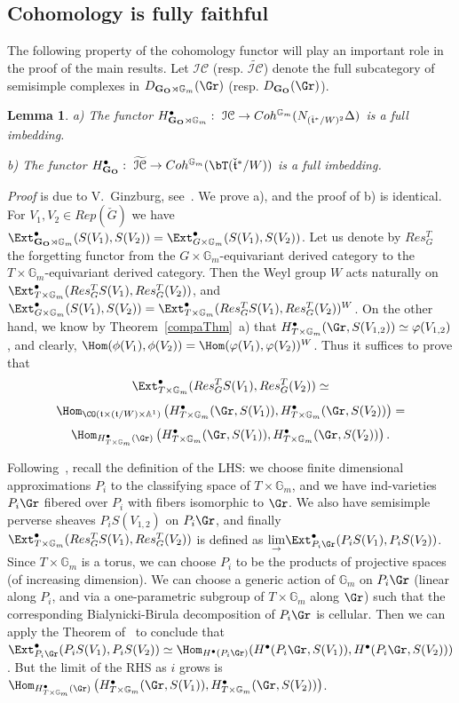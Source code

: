 \documentclass[11pt]{amsart}
\newtheorem{lem}{Lemma}
\theoremstyle{definition}
\theoremstyle{remark}
\theoremstyle{remark}
\newcommand{\<}{\langle}
\renewcommand{\>}{\rangle}
\renewcommand{\t}{{\frak t}}
\newcommand{\Lt}{\check{\mathfrak t}{}}
\newcommand{\LG}{{\check{G}}}
\newcommand{\GO}{{\bf G_O}}
\newcommand{\Aone}{{\mathbb A}^1}
\newcommand{\Gm}{{{\mathbb G}_m}}
\renewcommand{\proof}{{\it Proof }}
\newcommand{\CatTopss}{{\mathcal{IC}}}
\begin{document}
\subsection{Cohomology is fully faithful}
The following property of the cohomology functor will play an
important role in the proof of the main results.
Let $\CatTopss$ (resp. $\widetilde{\mathcal{IC}}$) 
denote the full subcategory of 
semisimple complexes in $D_{\GO\rtimes \Gm}(\Gr)$
(resp. $D_\GO(\Gr)$).


\begin{lem}
\label{fullyTop}
a) The functor $H_{\GO\rtimes\Gm}^\bullet:\
\CatTopss\to Coh^\Gm(N_{(\Lt^*/W)^2}\Delta)$ is a full
imbedding.

b) The functor $H_\GO^\bullet:\ 
\widetilde{\mathcal{IC}}\to Coh^\Gm(\bT(\Lt^*/W))$
is a full imbedding.
\end{lem}

\proof is due to V.~Ginzburg, see~\cite{G0}.
We prove a), and the proof of b) is identical.
For $V_1,V_2\in Rep(\LG)$ we have
$\Ext_{\GO\rtimes\Gm}^\bullet(S(V_1),S(V_2))=
\Ext_{G\times\Gm}^\bullet(S(V_1),S(V_2))$. Let us denote by $Res_G^T$
the forgetting functor from the $G\times\Gm$-equivariant derived
category to the $T\times\Gm$-equivariant derived category. Then the
Weyl group $W$ acts naturally on 
$\Ext_{T\times\Gm}^\bullet(Res_G^TS(V_1),Res_G^T(V_2))$, and 
$\Ext_{G\times\Gm}^\bullet(S(V_1),S(V_2))=
\Ext_{T\times\Gm}^\bullet(Res_G^TS(V_1),Res_G^T(V_2))^W$.
On the other hand, we know by Theorem~\ref{compaThm}~a) that
$H^\bullet_{T\times\Gm}(\Gr,S(V_{1,2}))\simeq\varphi(V_{1,2})$, and
clearly, $\Hom(\phi(V_1),\phi(V_2))=\Hom(\varphi(V_1),\varphi(V_2))^W$.
Thus it suffices to prove that
$$\Ext_{T\times\Gm}^\bullet(Res_G^TS(V_1),Res_G^T(V_2))\simeq$$
$$\Hom_{\CO(\t\times(\t/W)\times\Aone)}
\left(H^\bullet_{T\times\Gm}(\Gr,S(V_1)),
H^\bullet_{T\times\Gm}(\Gr,S(V_2))\right)=$$
$$\Hom_{H^\bullet_{T\times\Gm}(\Gr)}\left(H^\bullet_{T\times\Gm}(\Gr,S(V_1)),
H^\bullet_{T\times\Gm}(\Gr,S(V_2))\right).$$

Following~\cite{BL}, recall the definition of the LHS: we choose
finite dimensional approximations $P_i$ to the classifying space of 
$T\times\Gm$, and we have ind-varieties $P_i\Gr$ fibered over $P_i$
with fibers isomorphic to $\Gr$. We also have semisimple perverse
sheaves $P_iS(V_{1,2})$ on $P_i\Gr$, and finally
$\Ext_{T\times\Gm}^\bullet(Res_G^TS(V_1),Res_G^T(V_2))$ is defined as
$\underset{\to}{\lim}\Ext_{P_i\Gr}^\bullet(P_iS(V_1),P_iS(V_2))$.
Since $T\times\Gm$ is a torus, we can choose $P_i$ to be the products
of projective spaces (of increasing dimension).
We can choose a generic action of $\Gm$ on $P_i\Gr$ (linear along
$P_i$, and via a one-parametric subgroup of $T\times\Gm$ along $\Gr$)
such that the corresponding Bialynicki-Birula decomposition of
$P_i\Gr$ is cellular. Then we can apply the Theorem of~\cite{G0} to
conclude that $\Ext_{P_i\Gr}^\bullet(P_iS(V_1),P_iS(V_2))\simeq
\Hom_{H^\bullet(P_i\Gr)}(H^\bullet(P_i\Gr,S(V_1)),H^\bullet(P_i\Gr,S(V_2)))$. 
But the limit of the RHS as $i$ grows is 
$\Hom_{H^\bullet_{T\times\Gm}(\Gr)}\left(H^\bullet_{T\times\Gm}(\Gr,S(V_1)),
H^\bullet_{T\times\Gm}(\Gr,S(V_2))\right)$.
\end{document}
